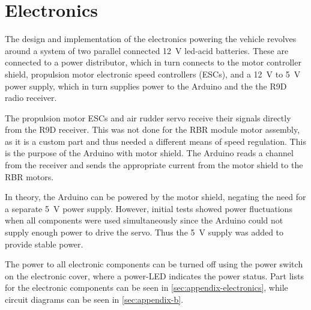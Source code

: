 \section{Electronics}

The design and implementation of the electronics powering the vehicle revolves around a system of two parallel connected 12~V led-acid batteries. These are connected to a power distributor, which in turn connects to the motor controller shield, propulsion
motor electronic speed controllers (ESCs),
and a 12~V to 5~V power supply, which in turn supplies power to the Arduino and the the R9D radio receiver.

The propulsion motor ESCs and air rudder servo receive their signals directly from the R9D receiver. This was not done for the RBR module motor assembly, as it is a custom part and thus needed a different means of speed regulation. This is the purpose of the Arduino with motor shield. The Arduino reads a channel from the receiver and sends the appropriate current from the motor shield to the RBR motors.

In theory, the Arduino can be powered by the motor shield, negating the need for a separate 5~V power supply.
However, initial tests showed power fluctuations when all components were used simultaneously since the Arduino could not supply enough power to drive the servo.
Thus the 5~V supply was added to provide stable power.

The power to all electronic components can be turned off using the power switch on the electronic cover, where a power-LED indicates the power status.  Part lists for the electronic components can be seen in \cref{sec:appendix-electronics},
while circuit diagrams can be seen in \cref{sec:appendix-b}.
